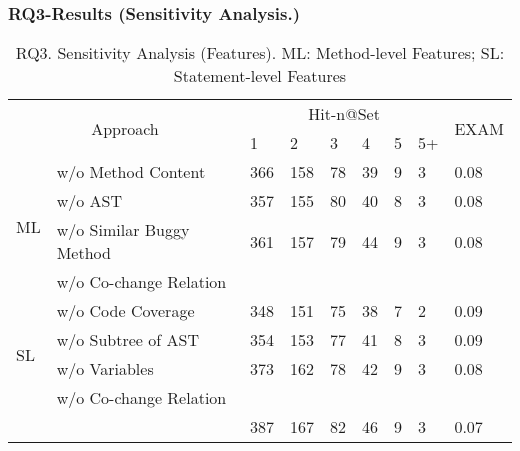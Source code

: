 \subsubsection{RQ3-Results ({\bf Sensitivity Analysis.})}



\begin{table}[h]
	\caption{RQ3. Sensitivity Analysis (Features). ML: Method-level Features; SL: Statement-level Features}
	{\small
		\begin{center}
			\renewcommand{\arraystretch}{1}
			\begin{tabular}{p{0.3cm}<{\centering}|p{3cm}|p{0.3cm}<{\centering}|p{0.3cm}<{\centering}|p{0.2cm}<{\centering}|p{0.2cm}<{\centering}|p{0.15cm}<{\centering}|p{0.15cm}<{\centering}|p{0.7cm}<{\centering}}
				\hline
				\multicolumn{2}{c|}{\multirow{2}{*}{Approach}}    & \multicolumn{6}{c|}{Hit-n@Set}& \multirow{2}{*}{EXAM}\\
				\cline{3-8}
				                 \multicolumn{2}{c|}{}   &1&2&3&4&5&5+&\\
				
				\hline 
				\multirow{4}{*}{ML}&w/o Method Content              & 366 & 158 & 78  & 39 & 9 & 3   & 0.08\\
				&w/o	AST	                        & 357 & 155 & 80  & 40 & 8 & 3   & 0.08\\
				&w/o Similar Buggy Method    	& 361 & 157 & 79  & 44 & 9 & 3   & 0.08\\
				&w/o Co-change Relation          &  &  &   &  &  &    & \\
				\hline
				\multirow{4}{*}{SL}&w/o Code Coverage               & 348 & 151 & 75  & 38 & 7 & 2   & 0.09\\
				&w/o	Subtree of AST  	        & 354 & 153 & 77  & 41 & 8 & 3   & 0.09\\
				&w/o Variables               	& 373 & 162 & 78  & 42 & 9 & 3   & 0.08\\
				&w/o Co-change Relation          &  &  &   &  &  &    & \\
				\hline
			&	\tool                           & 387 & 167 & 82  & 46 & 9 & 3   & 0.07\\
				\hline
			\end{tabular}
			
			\label{fig:rq3-1}
		\end{center}
	}
\end{table}

